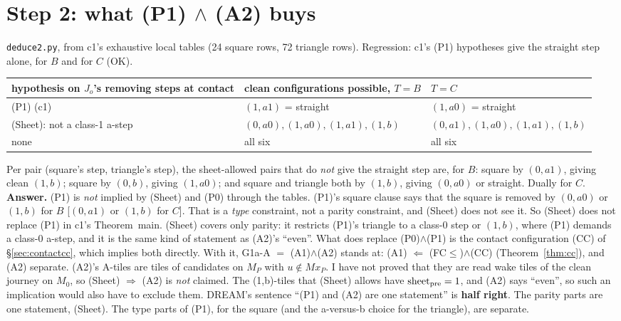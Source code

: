 \documentclass[11pt]{article}
\theoremstyle{definition}\newtheorem{definition}[theorem]{Definition}\newtheorem{remark}[theorem]{Remark}
\begin{document}
\section{Step 2: what (P1) $\wedge$ (A2) buys}\label{sec:step2}
\texttt{deduce2.py}, from c1's exhaustive local tables (24 square rows, 72 triangle rows). Regression: c1's (P1) hypotheses give the straight step alone, for $B$ and for $C$ (OK).
\begin{center}\begin{tabular}{lll}\toprule
hypothesis on $J_o$'s removing steps at contact & clean configurations possible, $T=B$ & $T=C$\\\midrule
(P1) (c1) & $(1,a1)$ = straight & $(1,a0)$ = straight\\
(Sheet): not a class-1 a-step & $(0,a0),(1,a0),(1,a1),(1,b)$ & $(0,a1),(1,a0),(1,a1),(1,b)$\\
none & all six & all six\\\bottomrule
\end{tabular}\end{center}
Per pair (square's step, triangle's step), the sheet-allowed pairs that do \emph{not} give the straight step are, for $B$: square by $(0,a1)$, giving clean $(1,b)$; square by $(0,b)$, giving $(1,a0)$; and square and triangle both by $(1,b)$, giving $(0,a0)$ or straight. Dually for $C$.
\textbf{Answer.} (P1) is \emph{not} implied by (Sheet) and (P0) through the tables. (P1)'s square clause says that the square is removed by $(0,a0)$ or $(1,b)$ for $B$ [$(0,a1)$ or $(1,b)$ for $C$]. That is a \emph{type} constraint, not a parity constraint, and (Sheet) does not see it.
So (Sheet) does not replace (P1) in c1's Theorem~main. (Sheet) covers only parity: it restricts (P1)'s triangle to a class-0 step or $(1,b)$, where (P1) demands a class-0 a-step, and it is the same kind of statement as (A2)'s ``even''. What does replace (P0)$\wedge$(P1) is the contact configuration (CC) of \S\ref{sec:contactcc}, which implies both directly. With it, G1a-A $=$ (A1)$\wedge$(A2) stands at: (A1) $\Leftarrow$ (FC$\le$)$\wedge$(CC) (Theorem~\ref{thm:cc}), and (A2) separate.
(A2)'s A-tiles are tiles of candidates on $M_P$ with $u\notin Mx_P$. I have not proved that they are read wake tiles of the clean journey on $M_0$, so (Sheet) $\Rightarrow$ (A2) is \emph{not} claimed. The (1,b)-tiles that (Sheet) allows have $\mathrm{sheet}_{\rm pre}=1$, and (A2) says ``even'', so such an implication would also have to exclude them.
DREAM's sentence ``(P1) and (A2) are one statement'' is \textbf{half right}. The parity parts are one statement, (Sheet). The type parts of (P1), for the square (and the a-versus-b choice for the triangle), are separate.
\end{document}
